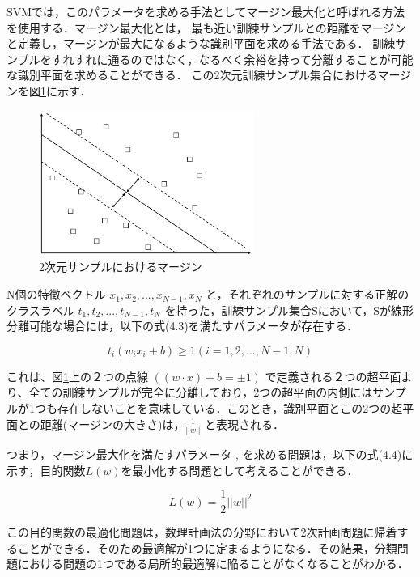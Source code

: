 SVMでは，このパラメータを求める手法としてマージン最大化と呼ばれる方法を使用する．マージン最大化とは，
最も近い訓練サンプルとの距離をマージンと定義し，マージンが最大になるような識別平面を求める手法である．
訓練サンプルをすれすれに通るのではなく，なるべく余裕を持って分離することが可能な識別平面を求めることができる．
この2次元訓練サンプル集合におけるマージンを図\ref{fig:margin}に示す．

\begin{figure}[htbp]
  \begin{center}
    \includegraphics[clip,width=7.0cm]{./images/margin.png}
    \caption{2次元サンプルにおけるマージン}
    \label{fig:margin}
  \end{center}
\end{figure}

N個の特徴ベクトル $ x_1,x_2, ... ,x_{N-1},x_N $ と，それぞれのサンプルに対する正解のクラスラベル $ t_1,t_2, ... ,t_{N-1},t_N $
を持った，訓練サンプル集合Sにおいて，Sが線形分離可能な場合には，以下の式(4.3)を満たすパラメータが存在する．

\begin{equation}
     t_i (w_i x_i + b) \geq 1 (i = 1,2,...,N-1,N)
\end{equation}

これは、図\ref{fig:margin}上の２つの点線 $ ((w \cdot x) + b = \pm 1) $ で定義される２つの超平面より、全ての訓練サンプルが完全に分離しており，2つの超平面の内側にはサンプルが1つも存在しないことを意味している．このとき，識別平面とこの2つの超平面との距離(マージンの大きさ)は，$ \frac{1}{||w||} $ と表現される．

\newpage

つまり，マージン最大化を満たすパラメータ , を求める問題は，以下の式(4.4)に示す，目的関数$ L(w) $を最小化する問題として考えることができる．

\begin{equation}
     L(w) = \frac{1}{2} ||w||^2
\end{equation}

この目的関数の最適化問題は，数理計画法の分野において2次計画問題に帰着することができる．そのため最適解が1つに定まるようになる．その結果，分類問題における問題の1つである局所的最適解に陥ることがなくなることがわかる．

